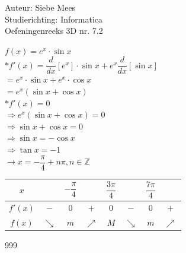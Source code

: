 \documentclass[a4paper]{article}
\begin{document}
  
\noindent \large Auteur: Siebe Mees \\
\noindent \large Studierichting: Informatica\\
\noindent \large Oefeningenreeks 3D nr. 7.2\\

\medskip

\normalsize

$ f(x) = e^x \cdot \sin x $ \\

$* f'(x) = \dfrac{d}{dx} \left[ e^x \right] \cdot \sin x + e^x \dfrac{d}{dx} \left[ \sin x \right] $ \\

$ = e^x \cdot \sin x + e^x \cdot \cos x $ \\

$ = e^x (\sin x+ \cos x) $ \\

$ * f'(x) = 0 $ \\

$ \Rightarrow e^x (\sin x+ \cos x)  = 0 $ \\

$ \Rightarrow \sin x+ \cos x  = 0 $ \\

$ \Rightarrow \sin x = -\cos x $ \\

$ \Rightarrow \tan x = -1 $ \\

$ \rightarrow x = -\dfrac{\pi}{4} + n\pi, n \in \mathbb{Z} $ \\

\begin{tabular}{c|ccccccc}
$x$      &             & $-\dfrac{\pi}{4}$ &             & $\dfrac{3\pi}{4}$ &             & $\dfrac{7\pi}{4}$ &             \\ \hline
$f'(x)$  & $-$         & $0$               & $+$         & $0$               & $-$         & $0$               & $+$         \\
$f(x)$   & $\searrow$  & $m$           & $\nearrow$  & $M$          & $\searrow$  & $m$           & $\nearrow$  
\end{tabular}


\begin{thebibliography}{999}
\end{thebibliography}
\end{document}
